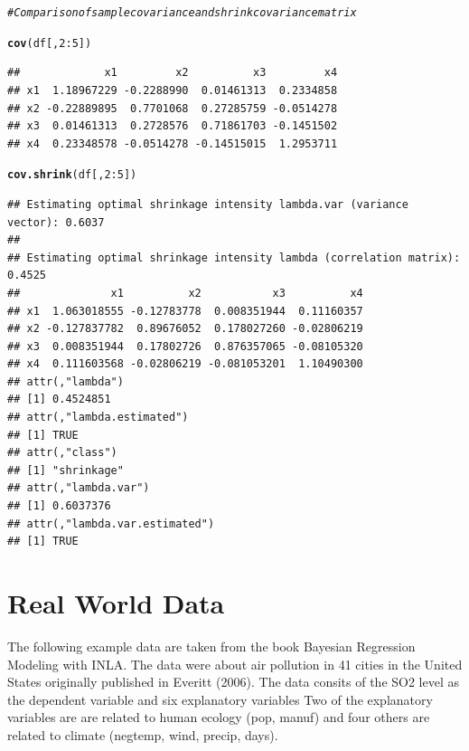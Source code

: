 \documentclass[11pt,a4paper,twoside]{book}\usepackage[]{graphicx}\usepackage[]{color}
\makeatletter
\newcommand{\hlnum}[1]{\textcolor[rgb]{0.686,0.059,0.569}{#1}}%
\newcommand{\hlcom}[1]{\textcolor[rgb]{0.678,0.584,0.686}{\textit{#1}}}%
\newcommand{\hlopt}[1]{\textcolor[rgb]{0,0,0}{#1}}%
\newcommand{\hlstd}[1]{\textcolor[rgb]{0.345,0.345,0.345}{#1}}%
\newcommand{\hlkwd}[1]{\textcolor[rgb]{0.737,0.353,0.396}{\textbf{#1}}}%
\newenvironment{kframe}{%
 \def\at@end@of@kframe{}%
 \ifinner\ifhmode%
  \def\at@end@of@kframe{\end{minipage}}%
  \begin{minipage}{\columnwidth}%
 \fi\fi%
 \def\FrameCommand##1{\hskip\@totalleftmargin \hskip-\fboxsep
 \colorbox{shadecolor}{##1}\hskip-\fboxsep
     \hskip-\linewidth \hskip-\@totalleftmargin \hskip\columnwidth}%
 \MakeFramed {\advance\hsize-\width
   \@totalleftmargin\z@ \linewidth\hsize
   \@setminipage}}%
 {\par\unskip\endMakeFramed%
 \at@end@of@kframe}
\newenvironment{knitrout}{}{} %
\makeatother
\begin{document}
\begin{knitrout}
\color{fgcolor}\begin{kframe}
\begin{alltt}
\hlcom{#Comparison of sample covariance and shrink covariance matrix}

\hlkwd{cov}\hlstd{(df[,}\hlnum{2}\hlopt{:}\hlnum{5}\hlstd{])}
\end{alltt}
\begin{verbatim}
##             x1         x2          x3         x4
## x1  1.18967229 -0.2288990  0.01461313  0.2334858
## x2 -0.22889895  0.7701068  0.27285759 -0.0514278
## x3  0.01461313  0.2728576  0.71861703 -0.1451502
## x4  0.23348578 -0.0514278 -0.14515015  1.2953711
\end{verbatim}
\begin{alltt}
\hlkwd{cov.shrink}\hlstd{(df[,}\hlnum{2}\hlopt{:}\hlnum{5}\hlstd{])}
\end{alltt}
\begin{verbatim}
## Estimating optimal shrinkage intensity lambda.var (variance vector): 0.6037 
## 
## Estimating optimal shrinkage intensity lambda (correlation matrix): 0.4525
##              x1          x2           x3          x4
## x1  1.063018555 -0.12783778  0.008351944  0.11160357
## x2 -0.127837782  0.89676052  0.178027260 -0.02806219
## x3  0.008351944  0.17802726  0.876357065 -0.08105320
## x4  0.111603568 -0.02806219 -0.081053201  1.10490300
## attr(,"lambda")
## [1] 0.4524851
## attr(,"lambda.estimated")
## [1] TRUE
## attr(,"class")
## [1] "shrinkage"
## attr(,"lambda.var")
## [1] 0.6037376
## attr(,"lambda.var.estimated")
## [1] TRUE
\end{verbatim}
\end{kframe}
\end{knitrout}

\section{Real World Data}


The following example data are taken from the book Bayesian Regression Modeling with INLA. The data were about air pollution in 41 cities in the United States originally published in Everitt (2006). The data consits of the SO2 level as the dependent variable and six explanatory variables 
Two of the explanatory variables are are related to human ecology (pop, manuf) and four others are related to climate (negtemp, wind, precip, days).
\end{document}
